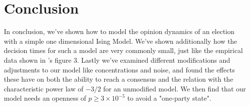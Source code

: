 \documentclass{article}
\begin{document}
\section{Conclusion}
In conclusion, we've shown how to model the opinion dynamics of an election with a simple one dimensional Ising Model. We've shown additionally how the decision times for such a model are very commonly small, just like the empirical data shown in \cite{sznajd}'s figure 3. Lastly we've examined different modifications and adjustments to our model like concentrations and noise, and found the effects these have on both the ability to reach a consensus and the relation with the characteristic power law of $-3/2$ for an unmodified model. We then find that our model needs an openness of $p \geq 3\times 10^{-5}$ to avoid a "one-party state".


\end{document}
